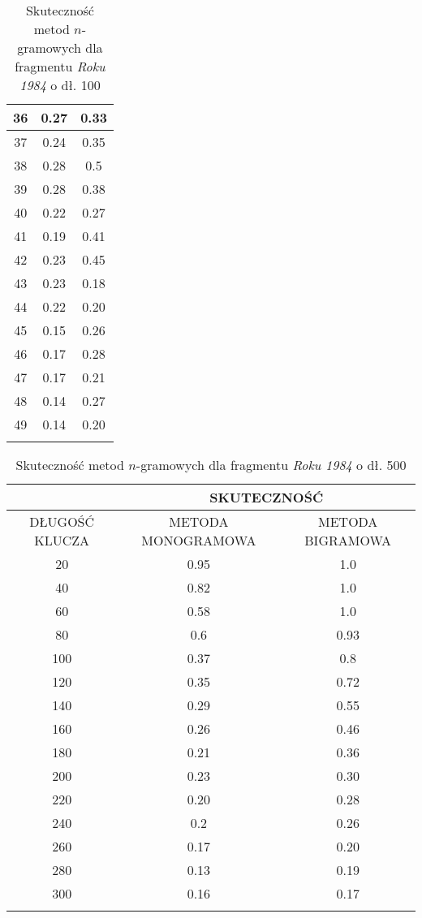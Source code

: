 \documentclass[a4paper]{article}
\theoremstyle{defn}
\theoremstyle{theorem}
\theoremstyle{lemma}
\theoremstyle{cor}
\theoremstyle{fact}
\begin{document}
\begin{center}
\begin{longtable}{
|c|c|c|}
36
 & 0.27 & 0.33\\ \hline
37
 & 0.24 & 0.35\\ \hline
38
 & 0.28 & 0.5\\ \hline
39
 & 0.28 & 0.38\\ \hline
40
 & 0.22 & 0.27\\ \hline
41
 & 0.19 & 0.41\\ \hline
42
 & 0.23 & 0.45\\ \hline
43
 & 0.23 & 0.18\\ \hline
44
 & 0.22 & 0.20\\ \hline
45
 & 0.15 & 0.26\\ \hline
46
 & 0.17 & 0.28\\ \hline
47
 & 0.17 & 0.21\\ \hline
48
 & 0.14 & 0.27\\ \hline
49
 & 0.14 & 0.20\\ \hline
 \caption{Skuteczność metod $n$-gramowych dla fragmentu \textit{Roku 1984} o dł. 100}
\end{longtable}\end{center}

\begin{center}\begin{longtable}{
|c|c|c|}
\hline &\multicolumn{2}{|c|}{SKUTECZNOŚĆ} \\ 
\hline DŁUGOŚĆ KLUCZA & METODA MONOGRAMOWA & METODA BIGRAMOWA\\ \hline
20
 & 0.95 & 1.0\\ \hline
40
 & 0.82 & 1.0\\ \hline
60
 & 0.58 & 1.0\\ \hline
80
 & 0.6 & 0.93\\ \hline
100
 & 0.37 & 0.8\\ \hline
120
 & 0.35 & 0.72\\ \hline
140
 & 0.29 & 0.55\\ \hline
160
 & 0.26 & 0.46\\ \hline
180
 & 0.21 & 0.36\\ \hline
200
 & 0.23 & 0.30\\ \hline
220
 & 0.20 & 0.28\\ \hline
240
 & 0.2 & 0.26\\ \hline
260
 & 0.17 & 0.20\\ \hline
280
 & 0.13 & 0.19\\ \hline
300
 & 0.16 & 0.17\\ \hline
  \caption{Skuteczność metod $n$-gramowych dla fragmentu \textit{Roku 1984} o dł. 500}
\end{longtable}\end{center}
\end{document}
